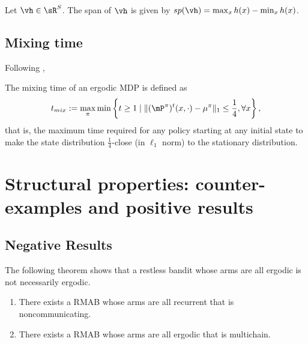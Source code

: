 Let $\vh\in\sR^S$. The span of $\vh$ is given by $sp(\vh)=\max_xh(x) - \min_xh(x)$.

\subsection{Mixing time}

Following \cite[Definition 5.1]{wei2020model},
\begin{defn}
    \label{def:mixing_time}
    The mixing time of an ergodic MDP is defined as
    \begin{align*}
        t_{mix} := \max_{\pi}\min\left\{ t\ge1 \mid \lVert (\mP^\pi)^t(x,\cdot) - \mu^\pi\rVert_1 \le \frac14, \forall x\right\},
    \end{align*}
    that is, the maximum time required for any policy starting at any initial state to make the state distribution $\frac14$-close (in $\ell_1$ norm) to the stationary distribution.
\end{defn}


\section{Structural properties: counter-examples and positive results}

\subsection{Negative Results}
The following theorem shows that a restless bandit whose arms are all ergodic is not necessarily ergodic.
\begin{thm}
    \begin{enumerate}[label=(\roman*)]
        \item \label{thm:not_ergodic} There exists a RMAB whose arms are all recurrent that is noncommunicating. %
        \item \label{thm:ergodic_arms_multichain_RB} There exists a RMAB whose arms are all ergodic that is multichain.
    \end{enumerate}
\end{thm}

